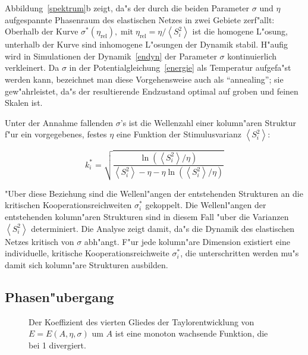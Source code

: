 Abbildung~\ref{spektrum}b zeigt, da"s der durch die beiden
Parameter $\sigma$ und $\eta$ aufgespannte Phasenraum des elastischen
Netzes in zwei Gebiete zerf"allt: Oberhalb der Kurve
$\sigma^\ast(\eta_{\text{rel}}),\;\text{mit}\;
\eta_{\text{rel}}=\eta/\left<S_i^2\right>$ ist die homogene L"osung,
unterhalb der Kurve  sind inhomogene L"osungen der Dynamik stabil.
H"aufig wird in Simulationen der Dynamik~\eqref{endyn} der Parameter
$\sigma$ kontinuierlich verkleinert. Da $\sigma$ in der
Potentialgleichung~\eqref{energie} als Temperatur aufgefa"st werden kann,
bezeichnet man diese Vorgehensweise  auch als ``annealing''; sie
gew"ahrleistet, da"s der resultierende Endzustand optimal auf groben und
feinen Skalen ist.

Unter der Annahme fallenden $\sigma$'s ist die Wellenzahl einer kolumn"aren
Struktur f"ur ein vorgegebenes, festes $\eta$ eine Funktion der
Stimulusvarianz $\left<S_i^2\right>$:

\begin{equation}
k_i^\ast = \sqrt{\frac{\ln\left(\left<S_i^2\right>/\eta\right)}{\left<S_i^2
\right>-\eta-\eta\ln\left(\left<S_i^2\right>/\eta\right)} }
\label{k_of_var}
\end{equation}

"Uber diese Beziehung sind die Wellenl"angen der entstehenden Strukturen an die
kritischen Kooperationsreichweiten $\sigma^\ast_i$ gekoppelt.  Die
Wellenl"angen der entstehenden kolumn"aren Strukturen sind in diesem
Fall "uber die Varianzen $\left<S_i^2\right>$ determiniert.  Die Analyse
zeigt damit, da"s die Dynamik des
elastischen Netzes   kritisch von $\sigma$ abh"angt. F"ur jede
kolumn"are Dimension existiert eine individuelle, kritische
Kooperationsreichweite $\sigma^\ast_i$, die unterschritten werden mu"s
damit sich kolumn"are Strukturen ausbilden.

\subsection{Phasen"ubergang}

\begin{figure}[t]
\begin{center}
\end{center}
\caption{Der Koeffizient des vierten Gliedes der Taylorentwicklung von
$E=E(A,\eta,\sigma)$ um $A$ ist eine monoton
wachsende Funktion, die bei 1 divergiert.}
\label{koeffizient}
\end{figure}

